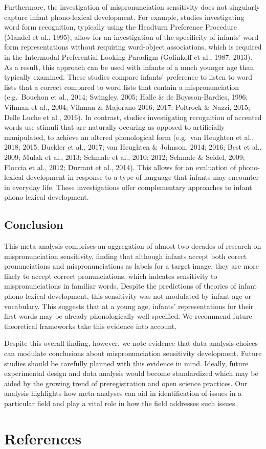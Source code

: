 \documentclass[man]{apa6}
\theoremstyle{definition}
\theoremstyle{definition}
\theoremstyle{definition}
\theoremstyle{remark}
\begin{document}
Furthermore, the investigation of mispronunciation sensitivity does not
singularly capture infant phono-lexical development. For example,
studies investigating word form recognition, typically using the
Headturn Preference Procedure (Mandel et al., 1995), allow for an
investigation of the specificity of infants' word form representations
without requiring word-object associations, which is required in the
Intermodal Preferential Looking Paradigm (Golinkoff et al., 1987; 2013).
As a result, this approach can be used with infants of a much younger
age than typically examined. These studies compare infants' preference
to listen to word lists that a correct compared to word lists that
contain a mispronunciation (e.g.~Bouchon et al., 2014; Swingley, 2005;
Halle \& de Boysson-Bardies, 1996; Vihman et al., 2004; Vihman \&
Majorano 2016; 2017; Poltrock \& Nazzi, 2015; Delle Luche et al., 2016).
In contrast, studies investigating recognition of accented words use
stimuli that are naturally occuring as opposed to artificially
manipulated, to achieve an altered phonological form (e.g.~van Heughten
et al., 2018; 2015; Buckler et al., 2017; van Heughten \& Johnson, 2014;
2016; Best et al., 2009; Mulak et al., 2013; Schmale et al., 2010; 2012;
Schmale \& Seidel, 2009; Floccia et al., 2012; Durrant et al., 2014).
This allows for an evaluation of phono-lexical development in response
to a type of language that infants may encounter in everyday life. These
investigations offer complementary approaches to infant phono-lexical
development.

\subsection{Conclusion}\label{conclusion}

This meta-analysis comprises an aggregation of almost two decades of
research on mispronunciation sensitivity, finding that although infants
accept both corect pronunciations and mispronunciations as labels for a
target image, they are more likely to accept correct pronunciations,
which indcates sensitivity to mispronunciations in familiar words.
Despite the predictions of theories of infant phono-lexical development,
this sensitivity was not modulated by infant age or vocabulary. This
suggests that at a young age, infants' representations for their first
words may be already phonologically well-specified. We recommend future
theoretical frameworks take this evidence into account.

Despite this overall finding, however, we note evidence that data
analysis choices can modulate conclusions about mispronunciation
sensitivity development. Future studies should be carefully planned with
this evidence in mind. Ideally, future experimental design and data
analysis would become standardized which may be aided by the growing
trend of preregistration and open science practices. Our analysis
highlights how meta-analyses can aid in identification of issues in a
particular field and play a vital role in how the field addresses such
issues.

\newpage

\section{References}\label{references}

\begingroup
\setlength{\parindent}{-0.5in} \setlength{\leftskip}{0.5in}

\hypertarget{refs}{}

\endgroup
\end{document}
